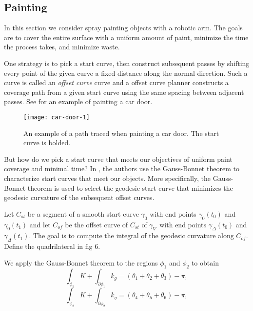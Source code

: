 \subsection{Painting}
\label{sec:painting-cars}



In this section we consider spray painting objects with a robotic arm.
The goals are to cover the entire surface with a uniform amount
of paint, minimize the time the process takes, and minimize waste.

One strategy is to pick a start curve, then construct subsequent passes 
by shifting every point of the given curve a fixed distance along the
normal direction. Such a curve is called an \emph{offset curve} curve and
a offset curve planner constructs a coverage path from a given
start curve using the same spacing between adjacent passes.
See 
for an example of painting a car door.


\begin{figure}[htb]
        \centering
        \texttt{[image: car-door-1]}
		\caption{An example of a path traced when painting a car door.
		The start curve is bolded.
		\label{fig:car-door}}
\end{figure}

But how do we pick a start curve that meets our objectives of uniform paint coverage 
and minimal time?
In \cite{atkar_towards_2003,atkar_uniform_2005}, the authors
use the Gauss-Bonnet theorem to characterize start curves that 
meet our objects. 
More specifically, the Gauss-Bonnet theorem is used to  select the geodesic
start curve that minimizes the geodesic curvature of the
subsequent offset curves. 

Let $C_{st}$  be a segment of a smooth start curve $\gamma_0$
with end points $\gamma_0(t_0)$ and $\gamma_0(t_1)$ and let
$C_{of}$ be the offset curve of $C_{st}$ of $\gamma_\nabla$
with end points $\gamma_\Delta(t_0)$ and $\gamma_\Delta(t_1).$
The goal is to compute the integral of the geodesic curvature along $C_{of}.$
Define the quadrilateral in fig 6.

We apply the Gauss-Bonnet theorem to the regions $\phi_1$ and $\phi_2$ to
obtain
\begin{equation}\label{eqn:phi-1}
\int_{\phi_1}K+\int_{\partial\phi_1}k_g=(\theta_1+\theta_2+\theta_3)-\pi,
\end{equation}
\begin{equation}\label{eqn:phi-2}
\int_{\phi_2}K+\int_{\partial\phi_2}k_g=(\theta_4+\theta_5+\theta_6)-\pi,
\end{equation}

